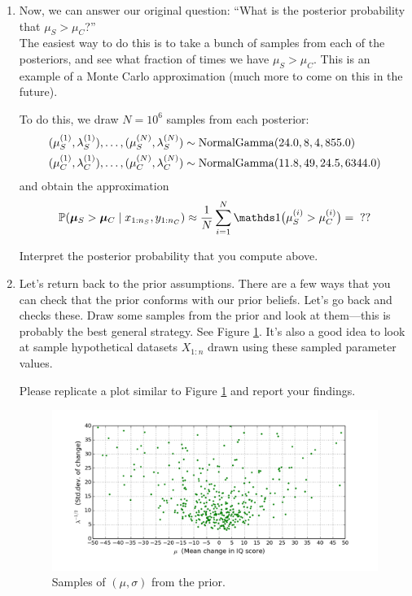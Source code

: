 \documentclass{article}
\begin{document}
\begin{enumerate}
\item Now, we can answer our original question: ``What is the posterior probability that $\mu_S>\mu_C$?'' \\

The easiest way to do this is to take a bunch of samples from each of the posteriors, and see what fraction of times we have $\mu_S>\mu_C$. This is an example of a Monte Carlo approximation (much more to come on this in the future). 

To do this, we draw $N=10^6$ samples from each posterior:
\begin{align*}
&(\mu_S^{(1)},\lambda_S^{(1)}),\dotsc,(\mu_S^{(N)},\lambda_S^{(N)})\sim \operatorname*{NormalGamma}(24.0,8,4,855.0)\\
&(\mu_C^{(1)},\lambda_C^{(1)}),\dotsc,(\mu_C^{(N)},\lambda_C^{(N)})\sim\operatorname*{NormalGamma}(11.8,49,24.5,6344.0)
\end{align*}
and obtain the approximation
\begin{align*}
\Pr(\bm\mu_S > \bm\mu_C \mid x_{1:n_S},y_{1:n_C}) 
\approx \frac{1}{N} \sum_{i = 1}^N \I\big(\mu_S^{(i)}>\mu_C^{(i)}\big) =  \;\;??
\end{align*}

Interpret the posterior probability that you compute above. 

\item Let's return back to the prior assumptions. There are a few ways that you can check that the prior conforms with our prior beliefs. Let's go back and checks these. Draw some samples from the prior and look at them---this is probably the best general strategy. See Figure \ref{figure:pygmalion-prior}. It's also a good idea to look at sample hypothetical datasets $X_{1:n}$ drawn using these sampled parameter values. 

Please replicate a plot similar to Figure \ref{figure:pygmalion-prior} and report your findings. 

\begin{figure}
  \begin{center}
    \includegraphics[width=1\textwidth]{examples/pygmalion-prior.png}
  \end{center}
  \caption{Samples of $(\mu,\sigma)$ from the prior.}
  \label{figure:pygmalion-prior}
\end{figure}




\end{enumerate}
\end{document}
